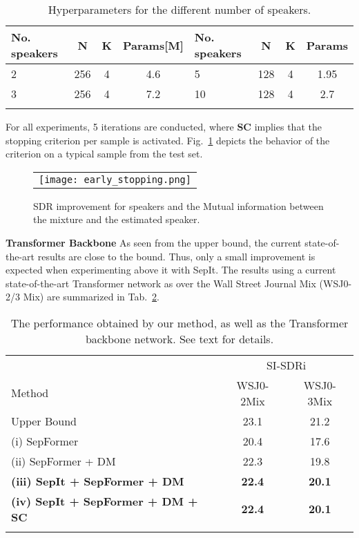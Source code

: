 \documentclass[a4paper]{article}
\theoremstyle{plain}
\theoremstyle{definition}
\theoremstyle{remark}
\begin{document}
\begin{table}[h!]
\caption{Hyperparameters for the different number of speakers.}
    \label{tab:model_size}
\centering \begin{tabular}{@{}l@{~}c@{~}c@{~}c@{~}|l@{~}c@{~}c@{~}c@{}} 
 \toprule
No. speakers &  N & K & Params[M]& No. speakers &  N & K & Params\\
\midrule
2 & 256& 4 & 4.6& 5 & 128 & 4& 1.95\\
\midrule
3 & 256& 4 & 7.2&10 & 128& 4 & 2.7\\
\bottomrule
 \vspace{-7mm}
\end{tabular}


\end{table}
For all experiments, 5 iterations are conducted, where \textbf{SC} implies that the stopping criterion per sample is activated. Fig.~\ref{fig:iter_stop} depicts the behavior of the criterion on  a typical sample from the test set.
 \begin{figure}
 \centering
\begin{tabular}{c}
\texttt{[image: early\_stopping.png]}
 \end{tabular}
 \vspace{-1mm}
 \caption{SDR improvement for  speakers and the Mutual information between the mixture and the estimated speaker.}
\label{fig:iter_stop}
\end{figure}

\textbf{Transformer Backbone}
As seen from the upper bound, the current state-of-the-art results are close to the bound. Thus, only a small improvement is expected when experimenting above it with SepIt. The results using a current state-of-the-art Transformer network \cite{subakan2021attention} as  over the Wall Street Journal Mix  (WSJ0-2/3 Mix) are summarized in Tab.~\ref{tab:results_2_3spkrs}.

\begin{table}[h!]
\caption{The performance obtained by our method, as well as the Transformer backbone network. See text for details.}
    \label{tab:results_2_3spkrs}
\centering \begin{tabular}{@{}l@{~}cc@{}} 
 \toprule
& \multicolumn{2}{c}{SI-SDRi {}}\\
 \cmidrule(lr){2-3}Method &  WSJ0-2Mix  & WSJ0-3Mix \\
\midrule
Upper Bound & 23.1 & 21.2\\
 \midrule
(i) SepFormer &20.4 & 17.6\\
(ii) SepFormer + DM &22.3 & 19.8\\
\midrule
{\bf(iii) SepIt + SepFormer + DM} &{\bf22.4} & {\bf20.1}\\
{\bf(iv) SepIt + SepFormer + DM + SC} &{\bf22.4} & {\bf20.1}\\
 \bottomrule
 \vspace{-7mm}
\end{tabular}

\end{table}
\end{document}
